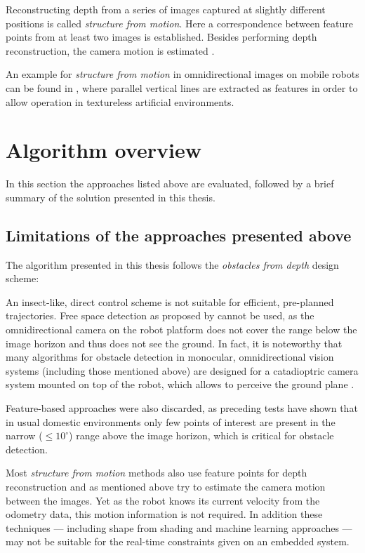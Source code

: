 \begin{description}
 Reconstructing depth from a series of images captured at slightly different positions is called \textit{structure from motion}. Here a correspondence between feature points from at least two images is established. Besides performing depth reconstruction, the camera motion is estimated \citep[see][chapter 4.2.6 ``Structure from motion'', p. 181ff.]{AutonomousMobileRobots}.

 An example for \textit{structure from motion} in omnidirectional images on mobile robots can be found in \citet{kawanishi2013parallel}, where parallel vertical lines are extracted as features in order to allow operation in textureless artificial environments.
\end{description}

\section{Algorithm overview}

In this section the approaches listed above are evaluated, followed by a brief summary of the solution presented in this thesis.

\subsection{Limitations of the approaches presented above}

The algorithm presented in this thesis follows the \textit{obstacles from depth} design scheme:

An insect-like, direct control scheme is not suitable for efficient, pre-planned trajectories. Free space detection as proposed by \citeauthor{yoshizaki:inria-00325322} cannot be used, as the omnidirectional camera on the robot platform does not cover the range below the image horizon and thus does not see the ground. In fact, it is noteworthy that many algorithms for obstacle detection in monocular, omnidirectional vision systems (including those mentioned above) are designed for a catadioptric camera system mounted on top of the robot, which allows to perceive the ground plane \citep{yasushi1999omnidirectional,kim2007omnidirectional}.

Feature-based approaches were also discarded, as preceding tests have shown that in usual domestic environments only few points of interest are present in the narrow ($\leq 10^\circ$) range above the image horizon, which is critical for obstacle detection.

Most \textit{structure from motion} methods also use feature points for depth reconstruction and as mentioned above try to estimate the camera motion between the images. Yet as the robot knows its current velocity from the odometry data, this motion information is not required. In addition these techniques --- including shape from shading and machine learning approaches --- may not be suitable for the real-time constraints given on an embedded system.


